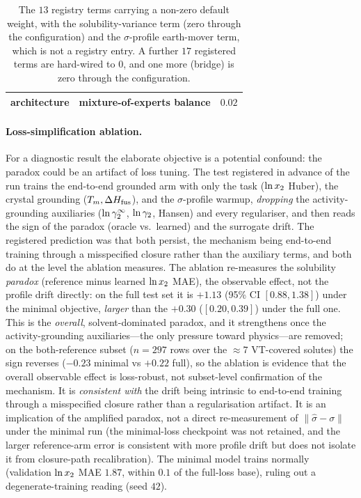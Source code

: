 \begin{table}[tp]
{\begin{tabular}{@{}llr@{}}
architecture         & mixture-of-experts balance                       & $0.02$ \\
\bottomrule
\end{tabular}}
\caption[Loss registry: the thirteen terms with a non-zero default weight]{The $13$ registry terms carrying a non-zero default weight, with the solubility-variance
term (zero through the configuration) and the $\sigma$-profile earth-mover term, which is not a
registry entry. A further $17$ registered terms are hard-wired to $0$, and one more (bridge)
is zero through the configuration.}
\label{tab:loss}
\end{table}

\paragraph{Loss-simplification ablation.}
For a diagnostic result the elaborate objective is a potential confound: the paradox
could be an artifact of loss tuning. The test registered in advance of the run trains the end-to-end
grounded arm with only the task ($\ln x_2$ Huber), the crystal grounding ($T_m,\Delta H_{\mathrm{fus}}$), and the
$\sigma$-profile warmup, \emph{dropping} the activity-grounding auxiliaries ($\ln\gamma_2^\infty$, $\ln\gamma_2$, Hansen)
and every regulariser, and then reads the sign of the paradox (oracle vs.\ learned) and the surrogate
drift. The registered prediction was that both persist, the mechanism being end-to-end training
through a misspecified closure rather than the auxiliary terms, and both do at the level the ablation
measures. The ablation re-measures the
solubility \emph{paradox} (reference minus learned $\ln x_2$ MAE), the observable effect, not the profile drift
directly: on the full test set it is $+1.13$ (95\% CI $[0.88,1.38]$) under the minimal objective,
\emph{larger} than the $+0.30$ ($[0.20,0.39]$) under the full one. This is the \emph{overall},
solvent-dominated paradox, and it strengthens once the activity-grounding auxiliaries---the only pressure
toward physics---are removed; on the both-reference subset ($n{=}297$ rows over the ${\approx}7$ VT-covered
solutes) the sign reverses ($-0.23$ minimal vs $+0.22$ full), so the ablation is evidence
that the overall observable effect is loss-robust, not subset-level confirmation of the mechanism. It is
\emph{consistent with} the drift being intrinsic to end-to-end training through a
misspecified closure rather than a regularisation artifact. It is an implication of the amplified paradox,
not a direct re-measurement of $\lVert\hat\sigma-\sigma\rVert$ under the minimal run (the minimal-loss
checkpoint was not retained, and the larger reference-arm error is consistent with more profile drift but
does not isolate it from closure-path recalibration). The minimal model trains normally (validation
$\ln x_2$ MAE $1.87$, within $0.1$ of the full-loss base), ruling out a degenerate-training reading
(seed $42$).

